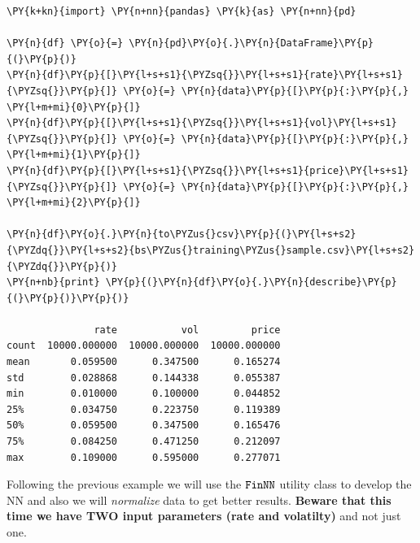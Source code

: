 \begin{tcolorbox}[breakable, size=fbox, boxrule=1pt, pad at break*=1mm,colback=cellbackground, colframe=cellborder]
\begin{Verbatim}[commandchars=\\\{\}]
\PY{k+kn}{import} \PY{n+nn}{pandas} \PY{k}{as} \PY{n+nn}{pd}
	
\PY{n}{df} \PY{o}{=} \PY{n}{pd}\PY{o}{.}\PY{n}{DataFrame}\PY{p}{(}\PY{p}{)}
\PY{n}{df}\PY{p}{[}\PY{l+s+s1}{\PYZsq{}}\PY{l+s+s1}{rate}\PY{l+s+s1}{\PYZsq{}}\PY{p}{]} \PY{o}{=} \PY{n}{data}\PY{p}{[}\PY{p}{:}\PY{p}{,} \PY{l+m+mi}{0}\PY{p}{]}
\PY{n}{df}\PY{p}{[}\PY{l+s+s1}{\PYZsq{}}\PY{l+s+s1}{vol}\PY{l+s+s1}{\PYZsq{}}\PY{p}{]} \PY{o}{=} \PY{n}{data}\PY{p}{[}\PY{p}{:}\PY{p}{,} \PY{l+m+mi}{1}\PY{p}{]}
\PY{n}{df}\PY{p}{[}\PY{l+s+s1}{\PYZsq{}}\PY{l+s+s1}{price}\PY{l+s+s1}{\PYZsq{}}\PY{p}{]} \PY{o}{=} \PY{n}{data}\PY{p}{[}\PY{p}{:}\PY{p}{,} \PY{l+m+mi}{2}\PY{p}{]}
	
\PY{n}{df}\PY{o}{.}\PY{n}{to\PYZus{}csv}\PY{p}{(}\PY{l+s+s2}{\PYZdq{}}\PY{l+s+s2}{bs\PYZus{}training\PYZus{}sample.csv}\PY{l+s+s2}{\PYZdq{}}\PY{p}{)}
\PY{n+nb}{print} \PY{p}{(}\PY{n}{df}\PY{o}{.}\PY{n}{describe}\PY{p}{(}\PY{p}{)}\PY{p}{)}

               rate           vol         price
count  10000.000000  10000.000000  10000.000000
mean       0.059500      0.347500      0.165274
std        0.028868      0.144338      0.055387
min        0.010000      0.100000      0.044852
25%        0.034750      0.223750      0.119389
50%        0.059500      0.347500      0.165476
75%        0.084250      0.471250      0.212097
max        0.109000      0.595000      0.277071
\end{Verbatim}
\end{tcolorbox}

Following the previous example we will use the \(\tt{FinNN}\) utility
class to develop the NN and also we will \emph{normalize} data to get
better results. \textbf{Beware that this time we have TWO input
parameters (rate and volatilty)} and not just one.

